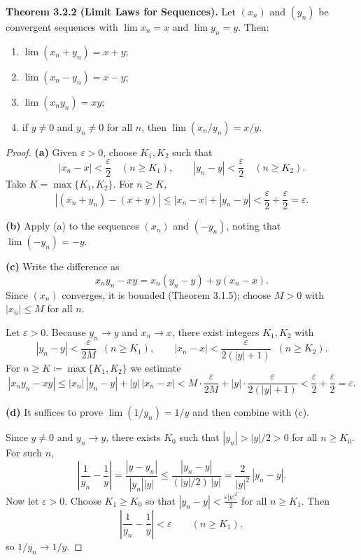 \documentclass[12pt,a4paper]{article}
\theoremstyle{definition}
\newcommand{\eps}{\varepsilon}
\newcommand{\abs}[1]{\left\lvert#1\right\rvert}
\begin{document}
\textbf{Theorem 3.2.2 (Limit Laws for Sequences).} Let \((x_n)\) and \((y_n)\) be convergent sequences with \(\lim x_n = x\) and \(\lim y_n = y\). Then:
\begin{enumerate}[label=(\alph*)]
    \item \(\lim (x_n + y_n) = x + y\);
    \item \(\lim (x_n - y_n) = x - y\);
    \item \(\lim (x_n y_n) = x y\);
    \item if \(y\neq0\) and \(y_n\neq0\) for all \(n\), then \(\lim (x_n / y_n) = x/y\).
\end{enumerate}

\begin{proof}
\textbf{(a)} Given \(\eps>0\), choose \(K_1,K_2\) such that
\[
\abs{x_n-x}<\frac{\eps}{2}\quad (n\ge K_1),\qquad 
\abs{y_n-y}<\frac{\eps}{2}\quad (n\ge K_2).
\]
Take \(K=\max\{K_1,K_2\}\). For \(n\ge K\),
\[
\abs{(x_n+y_n)-(x+y)} \le \abs{x_n-x}+\abs{y_n-y} < \frac{\eps}{2}+\frac{\eps}{2}=\eps.
\]

\textbf{(b)} Apply (a) to the sequences \((x_n)\) and \((-y_n)\), noting that \(\lim(-y_n) = -y\).

\textbf{(c)} Write the difference as
\[
x_ny_n - xy = x_n(y_n-y) + y(x_n-x).
\]
Since \((x_n)\) converges, it is bounded (Theorem 3.1.5); choose \(M>0\) with \(\abs{x_n}\le M\) for all \(n\).

Let \(\eps>0\). Because \(y_n\to y\) and \(x_n\to x\), there exist integers \(K_1,K_2\) with
\[
\abs{y_n-y} < \frac{\eps}{2M}\;\;(n\ge K_1),\qquad 
\abs{x_n-x} < \frac{\eps}{2(\abs{y}+1)}\;\;(n\ge K_2).
\]
For \(n\ge K\coloneqq\max\{K_1,K_2\}\) we estimate
\[
\abs{x_ny_n-xy} \le \abs{x_n}\,\abs{y_n-y} + \abs{y}\,\abs{x_n-x}
< M\cdot\frac{\eps}{2M} + \abs{y}\cdot\frac{\eps}{2(\abs{y}+1)} < \frac{\eps}{2}+\frac{\eps}{2}=\eps.
\]

\textbf{(d)} It suffices to prove \(\lim(1/y_n)=1/y\) and then combine with (c).

Since \(y\neq0\) and \(y_n\to y\), there exists \(K_0\) such that \(\abs{y_n} > \abs{y}/2 > 0\) for all \(n\ge K_0\). For such \(n\),
\[
\abs{\frac{1}{y_n}-\frac{1}{y}} = \frac{\abs{y-y_n}}{\abs{y_n}\abs{y}}
\le \frac{\abs{y_n-y}}{(\abs{y}/2)\,\abs{y}} = \frac{2}{\abs{y}^2}\,\abs{y_n-y}.
\]
Now let \(\eps>0\). Choose \(K_1\ge K_0\) so that \(\abs{y_n-y} < \frac{\eps\abs{y}^2}{2}\) for all \(n\ge K_1\). Then
\[
\abs{\frac{1}{y_n}-\frac{1}{y}} < \eps \qquad (n\ge K_1),
\]
so \(1/y_n\to 1/y\).
\end{proof}
\end{document}
